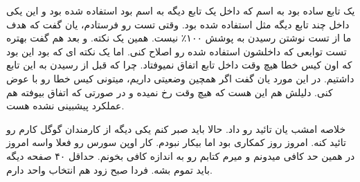یک تابع ساده بود به اسم  که داخل یک تابع دیگه به اسم  بود استفاده شده بود و این یکی داخل
چند تابع دیگه مثل  استفاده شده بود. وقتی تست رو فرستادم، یان گفت که هدف ما از تست نوشتن رسیدن به پوشش ۱۰۰٪ نیست.
همین یک نکته. و بعد هم گفت بهتره تست توابعی که داخلشون استفاده شده رو اصلاح کنی. اما یک نکته ای که بود این بود که اون کیس خطا
هیچ وقت داخل تابع  اتفاق نمیوفتاد. چرا که قبل از رسیدن به این تابع  داشتیم.
در این مورد یان گفت اگر همچین وضعیتی داریم، میتونی کیس خطا رو با  عوض کنی. دلیلش هم این هست که هیچ وقت رخ نمیده و
در صورتی که اتفاق بیوفته هم عملکرد پیشبینی نشده هست.

خلاصه امشب یان تائید رو داد. حالا باید صبر کنم یکی دیگه از کارمندان گوگل کارم رو تائید کنه. امروز روز کمکاری بود اما بیکار نبودم.
کار اوپن سورس رو فعلا واسه امروز در همین حد کافی میدونم و میرم کتابم رو به اندازه کافی بخونم. حداقل ۴۰ صفحه دیگه باید تموم بشه.
فردا صبح زود هم انتخاب واحد دارم.


